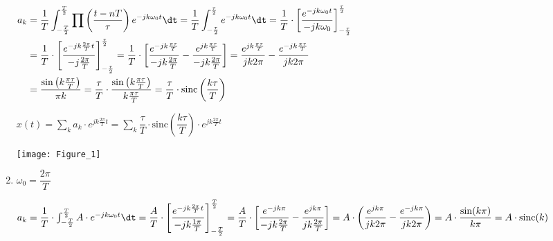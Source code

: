 \begin{enumerate}[label=\color{red}\textbf{\arabic*)}]
      $\begin{aligned}
          a_k & =\dfrac{1}{T}\int_{-\frac{T}{2} }^{\frac{T}{2} } \prod\left( \dfrac{t-nT}{\tau}\right)e^{-jk\omega_0 t}\dt=\dfrac{1}{T}\int_{-\frac{\tau}{2} }^{\frac{\tau}{2} } e^{-jk\omega_0t}\dt =\dfrac{1}{T}\cdot \left[ \dfrac{e^{-jk\omega_0t} }{-jk\omega_0} \right]_{-\frac{\tau}{2} }^{\frac{\tau}{2} }\\ 
              & =\dfrac{1}{T}\cdot \left[ \dfrac{e^{-jk\frac{2\pi}{T} t} }{-j\frac{2\pi}{T} } \right] _{-\frac{\tau}{2} }^{\frac{\tau}{2} }=\dfrac{1}{T}\cdot \left[\dfrac{e^{-jk\frac{\pi\tau}{T} } }{-jk\frac{2\pi}{T} }-\dfrac{e^{jk\frac{\pi\tau}{T} } }{-jk\frac{2\pi}{T} }  \right] =\dfrac{e^{jk\frac{\pi\tau}{T} } }{jk 2\pi}-\dfrac{e^{-jk\frac{\pi\tau}{T} } }{jk 2\pi}\\
              & =\dfrac{\sin\left( k\frac{\pi\tau}{T}  \right) }{\pi k}=\dfrac{\tau}{T}\cdot \dfrac{\sin\left( k\frac{\pi\tau}{T}  \right) }{k\frac{\pi\tau}{T} }=\dfrac{\tau}{T}\cdot \text{sinc}\left( \dfrac{k\tau}{T} \right) 
      \end{aligned}
      $

      $x(t)=\sum_k a_k\cdot e^{jk\frac{2\pi}{T} t} =\sum_k \dfrac{\tau}{T}\cdot \text{sinc}\left( \dfrac{k\tau}{T} \right) \cdot e^{jk\frac{2\pi}{T} t} $

      \begin{center}
      	\texttt{[image: Figure\_1]}
      \end{center}
      \newpage
  \item {} 
\begin{center}
\end{center}

  $\omega_0=\dfrac{2\pi}{T}$

  $a_k=\dfrac{1}{T}\cdot \int_{-\frac{T}{2} }^{\frac{T}{2} } A\cdot e^{-jk\omega_0t}\dt=\dfrac{A}{T}\cdot \left[ \dfrac{e^{-jk\frac{2\pi}{T} t} }{-jk\frac{1\pi}{T} } \right] _{-\frac{T}{2} }^{\frac{T}{2} }=\dfrac{A}{T}\cdot \left[ \dfrac{e^{-jk\pi} }{-jk\frac{2\pi}{T} }-\dfrac{e^{jk\pi} }{jk\frac{2\pi}{T} }  \right] =A\cdot \left( \dfrac{e^{jk\pi} }{jk 2\pi}-\dfrac{e^{-jk\pi} }{jk 2\pi} \right) =A\cdot \dfrac{\sin(k\pi)}{k\pi}=A\cdot \text{sinc}(k)  $


\end{enumerate}
